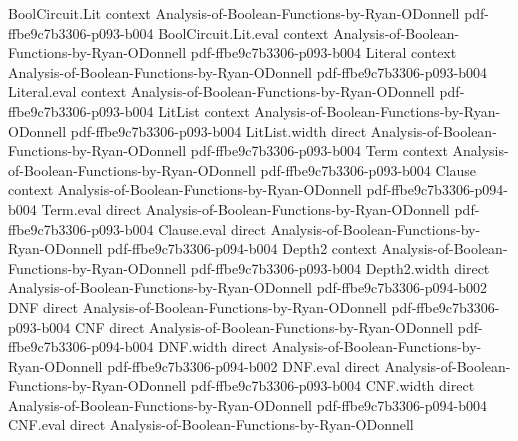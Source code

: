 \begin{lemma}
\leanok
{}
\proofstep
  {BoolCircuit.Lit}
  {context}
  {Analysis-of-Boolean-Functions-by-Ryan-ODonnell}
  {pdf-ffbe9c7b3306-p093-b004}
\proofstep
  {BoolCircuit.Lit.eval}
  {context}
  {Analysis-of-Boolean-Functions-by-Ryan-ODonnell}
  {pdf-ffbe9c7b3306-p093-b004}
\proofstep
  {Literal}
  {context}
  {Analysis-of-Boolean-Functions-by-Ryan-ODonnell}
  {pdf-ffbe9c7b3306-p093-b004}
\proofstep
  {Literal.eval}
  {context}
  {Analysis-of-Boolean-Functions-by-Ryan-ODonnell}
  {pdf-ffbe9c7b3306-p093-b004}
\proofstep
  {LitList}
  {context}
  {Analysis-of-Boolean-Functions-by-Ryan-ODonnell}
  {pdf-ffbe9c7b3306-p093-b004}
\proofstep
  {LitList.width}
  {direct}
  {Analysis-of-Boolean-Functions-by-Ryan-ODonnell}
  {pdf-ffbe9c7b3306-p093-b004}
\proofstep
  {Term}
  {context}
  {Analysis-of-Boolean-Functions-by-Ryan-ODonnell}
  {pdf-ffbe9c7b3306-p093-b004}
\proofstep
  {Clause}
  {context}
  {Analysis-of-Boolean-Functions-by-Ryan-ODonnell}
  {pdf-ffbe9c7b3306-p094-b004}
\proofstep
  {Term.eval}
  {direct}
  {Analysis-of-Boolean-Functions-by-Ryan-ODonnell}
  {pdf-ffbe9c7b3306-p093-b004}
\proofstep
  {Clause.eval}
  {direct}
  {Analysis-of-Boolean-Functions-by-Ryan-ODonnell}
  {pdf-ffbe9c7b3306-p094-b004}
\proofstep
  {Depth2}
  {context}
  {Analysis-of-Boolean-Functions-by-Ryan-ODonnell}
  {pdf-ffbe9c7b3306-p093-b004}
\proofstep
  {Depth2.width}
  {direct}
  {Analysis-of-Boolean-Functions-by-Ryan-ODonnell}
  {pdf-ffbe9c7b3306-p094-b002}
\proofstep
  {DNF}
  {direct}
  {Analysis-of-Boolean-Functions-by-Ryan-ODonnell}
  {pdf-ffbe9c7b3306-p093-b004}
\proofstep
  {CNF}
  {direct}
  {Analysis-of-Boolean-Functions-by-Ryan-ODonnell}
  {pdf-ffbe9c7b3306-p094-b004}
\proofstep
  {DNF.width}
  {direct}
  {Analysis-of-Boolean-Functions-by-Ryan-ODonnell}
  {pdf-ffbe9c7b3306-p094-b002}
\proofstep
  {DNF.eval}
  {direct}
  {Analysis-of-Boolean-Functions-by-Ryan-ODonnell}
  {pdf-ffbe9c7b3306-p093-b004}
\proofstep
  {CNF.width}
  {direct}
  {Analysis-of-Boolean-Functions-by-Ryan-ODonnell}
  {pdf-ffbe9c7b3306-p094-b004}
\proofstep
  {CNF.eval}
  {direct}
  {Analysis-of-Boolean-Functions-by-Ryan-ODonnell}

\end{lemma}
